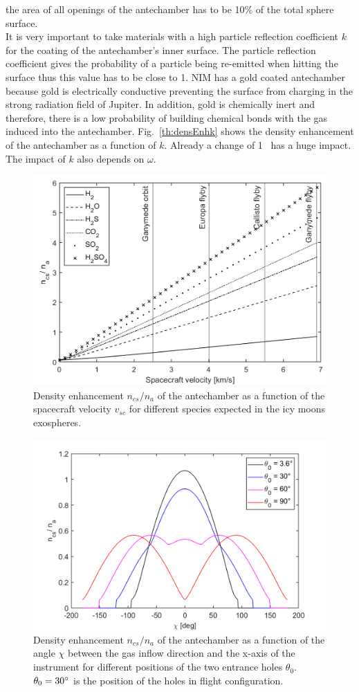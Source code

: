 	the area of all openings of the antechamber has to be 10\% of the total sphere surface.\\
	It is very important to take materials with a high particle reflection coefficient $k$ for the coating of the antechamber's inner surface. The particle reflection coefficient gives the probability of a particle being re-emitted when hitting the surface thus this value has to be close to 1. NIM has a gold coated antechamber because gold is electrically conductive preventing the surface from charging in the strong radiation field of Jupiter. In addition, gold is chemically inert and therefore, there is a low probability of building chemical bonds with the gas induced into the antechamber. Fig.~\ref{th:densEnhk} shows the density enhancement of the antechamber as a function of $k$. Already a change of 1\textperthousand~ has a huge impact. The impact of $k$ also depends on $\omega$.
	\begin{figure}[h!] %
		\centering
		\includegraphics[width= .7\textwidth]{Bilder/velocityV1.png}
		\caption{Density enhancement $n_{cs}/n_a$ of the antechamber as a function of the spacecraft velocity $v_{sc}$ for different species expected in the icy moons exospheres.}
		\label{th:densEnhvelo}
	\end{figure}
	\begin{figure}[h!] %
		\centering
		\includegraphics[width= .8\textwidth]{Bilder/Chi_theta0.png}
		\caption{Density enhancement $n_{cs}/n_a$ of the antechamber as a function of the angle $\chi$ between the gas inflow direction and the x-axis of the instrument for different positions of the two entrance holes $\theta_0$. $\theta_0=30^\circ$ is the position of the holes in flight configuration.}
		\label{th:densEnhChiTheta}
	\end{figure}
